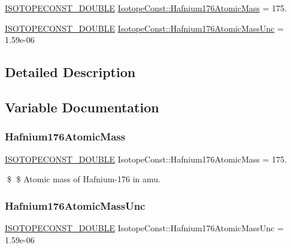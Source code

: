 \begin{DoxyCompactItemize}
\item 
\mbox{\hyperlink{group___isotope_const-_macros_ga8f45a7272ce02c0b4c65c44636ed719a}{I\+S\+O\+T\+O\+P\+E\+C\+O\+N\+S\+T\+\_\+\+D\+O\+U\+B\+LE}} \mbox{\hyperlink{group___isotope_const-_hafnium-_hf176_gaac0f0ca4cc8f3c538d9b733e66093b8b}{Isotope\+Const\+::\+Hafnium176\+Atomic\+Mass}} = 175.
\item 
\mbox{\hyperlink{group___isotope_const-_macros_ga8f45a7272ce02c0b4c65c44636ed719a}{I\+S\+O\+T\+O\+P\+E\+C\+O\+N\+S\+T\+\_\+\+D\+O\+U\+B\+LE}} \mbox{\hyperlink{group___isotope_const-_hafnium-_hf176_gae3b057e96108d4964d00515e832524b6}{Isotope\+Const\+::\+Hafnium176\+Atomic\+Mass\+Unc}} = 1.\+59e-\/06
\end{DoxyCompactItemize}


\subsection{Detailed Description}


\subsection{Variable Documentation}
\mbox{\label{group___isotope_const-_hafnium-_hf176_gaac0f0ca4cc8f3c538d9b733e66093b8b}} 
\subsubsection{\texorpdfstring{Hafnium176\+Atomic\+Mass}{Hafnium176AtomicMass}}
{\footnotesize\ttfamily \mbox{\hyperlink{group___isotope_const-_macros_ga8f45a7272ce02c0b4c65c44636ed719a}{I\+S\+O\+T\+O\+P\+E\+C\+O\+N\+S\+T\+\_\+\+D\+O\+U\+B\+LE}} Isotope\+Const\+::\+Hafnium176\+Atomic\+Mass = 175.}

\$ \$ Atomic mass of Hafnium-\/176 in amu. \mbox{\label{group___isotope_const-_hafnium-_hf176_gae3b057e96108d4964d00515e832524b6}} 
\subsubsection{\texorpdfstring{Hafnium176\+Atomic\+Mass\+Unc}{Hafnium176AtomicMassUnc}}
{\footnotesize\ttfamily \mbox{\hyperlink{group___isotope_const-_macros_ga8f45a7272ce02c0b4c65c44636ed719a}{I\+S\+O\+T\+O\+P\+E\+C\+O\+N\+S\+T\+\_\+\+D\+O\+U\+B\+LE}} Isotope\+Const\+::\+Hafnium176\+Atomic\+Mass\+Unc = 1.\+59e-\/06}

